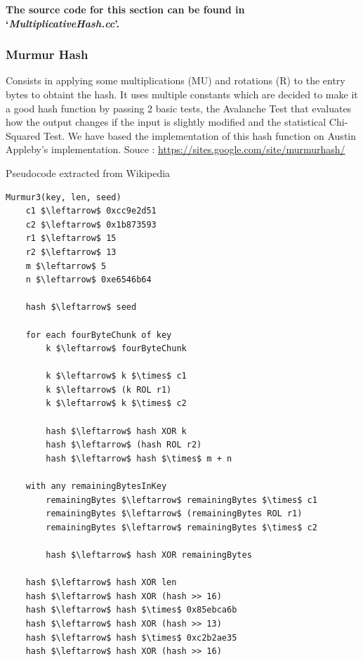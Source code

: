 \documentclass[12pt]{article}
\begin{document}
\textbf{The source code for this section can be found in `\textit{MultiplicativeHash.cc}'.}
\bigskip



\subsubsection{Murmur Hash}

Consists in applying some multiplications (MU) and rotations (R) to the entry bytes to obtaint the hash. It uses multiple constants which are decided to make it a good hash function by passing 2 basic tests, the Avalanche Test that evaluates how the output changes if the input is slightly modified and the statistical Chi-Squared Test. We have based the implementation of this hash function on Austin Appleby's implementation. Souce : \url{https://sites.google.com/site/murmurhash/}\\
\medskip
\begin{center}
\begin{large}
Pseudocode extracted from Wikipedia
\end{large}
\end{center}

\begin{lstlisting}[mathescape=true]
Murmur3(key, len, seed)
    c1 $\leftarrow$ 0xcc9e2d51
    c2 $\leftarrow$ 0x1b873593
    r1 $\leftarrow$ 15
    r2 $\leftarrow$ 13
    m $\leftarrow$ 5
    n $\leftarrow$ 0xe6546b64
 
    hash $\leftarrow$ seed

    for each fourByteChunk of key
        k $\leftarrow$ fourByteChunk

        k $\leftarrow$ k $\times$ c1
        k $\leftarrow$ (k ROL r1)
        k $\leftarrow$ k $\times$ c2

        hash $\leftarrow$ hash XOR k
        hash $\leftarrow$ (hash ROL r2)
        hash $\leftarrow$ hash $\times$ m + n

    with any remainingBytesInKey
        remainingBytes $\leftarrow$ remainingBytes $\times$ c1
        remainingBytes $\leftarrow$ (remainingBytes ROL r1)
        remainingBytes $\leftarrow$ remainingBytes $\times$ c2

        hash $\leftarrow$ hash XOR remainingBytes
 
    hash $\leftarrow$ hash XOR len
    hash $\leftarrow$ hash XOR (hash >> 16)
    hash $\leftarrow$ hash $\times$ 0x85ebca6b
    hash $\leftarrow$ hash XOR (hash >> 13)
    hash $\leftarrow$ hash $\times$ 0xc2b2ae35
    hash $\leftarrow$ hash XOR (hash >> 16)

\end{lstlisting}
\end{document}
